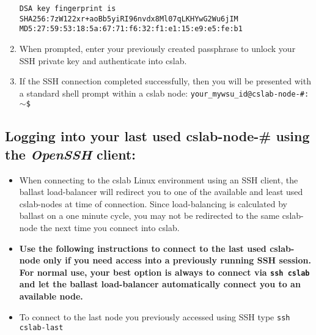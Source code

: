 \documentclass[12pt]{article}
\begin{document}
\begin{flushleft}
\begin{enumerate}
\begin{verbatim}
DSA key fingerprint is
SHA256:7zW122xr+aoBb5yiRI96nvdx8Ml07qLKHYwG2Wu6jIM
MD5:27:59:53:18:5a:67:71:f6:32:f1:e1:15:e9:e5:fe:b1
\end{verbatim}

  \item When prompted, enter your previously created passphrase to unlock your SSH private key and authenticate into cslab.
  \item If the SSH connection completed successfully, then you will be presented with a standard shell prompt within a cslab node:\break
\texttt{your\_mywsu\_id@cslab-node-\#:$\sim$\$}
\end{enumerate}
\newpage
\subsection*{Logging into your last used cslab-node-\# using the \textit{OpenSSH} client:}
\begin{itemize}
  \item When connecting to the cslab Linux environment using an SSH client, the ballast load-balancer will redirect you to one of the available and least used cslab-nodes at time of connection. Since load-balancing is calculated by ballast on a one minute cycle, you may not be redirected to the same cslab-node the next time you connect into cslab.

  \item \textbf{Use the following instructions to connect to the last used cslab-node only if you need access into a previously running SSH session. For normal use, your best option is always to connect via \texttt{ssh cslab} and let the ballast load-balancer automatically connect you to an available node.}
  \item To connect to the last node you previously accessed using SSH type \break
  \texttt{ssh cslab-last}
\end{itemize}


\end{flushleft}
\end{document}
